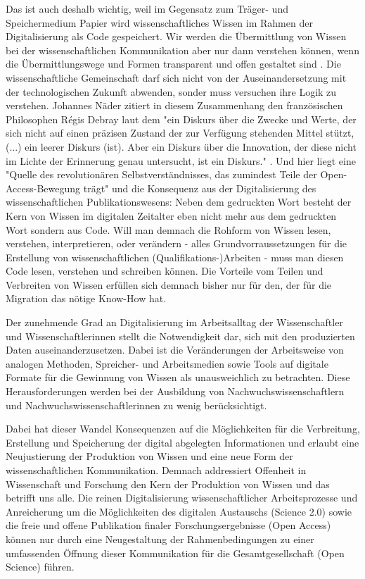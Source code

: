Das ist auch deshalb wichtig, weil im Gegensatz zum Träger- und Speichermedium Papier wird wissenschaftliches Wissen im Rahmen der Digitalisierung als Code gespeichert. Wir werden die Übermittlung von Wissen bei der wissenschaftlichen Kommunikation aber nur dann verstehen können, wenn die Übermittlungswege und Formen transparent und offen gestaltet sind \cite{davis_2011_open}. Die wissenschaftliche Gemeinschaft darf sich nicht von der Auseinandersetzung mit der technologischen Zukunft abwenden, sonder muss versuchen ihre Logik zu verstehen. Johannes Näder zitiert in diesem Zusammenhang den französischen Philosophen Régis Debray laut dem "ein Diskurs über die Zwecke und Werte, der sich nicht auf einen präzisen Zustand der zur Verfügung stehenden Mittel stützt, (...) ein leerer Diskurs (ist). Aber ein Diskurs über die Innovation, der diese nicht im Lichte der Erinnerung genau untersucht, ist ein Diskurs." \cite[:117]{naeder_2010_open} \cite[:246]{debray2003einfuhrung}. Und hier liegt eine "Quelle des revolutionären Selbstverständnisses, das zumindest Teile der Open-Access-Bewegung trägt" und die Konsequenz aus der Digitalisierung des wissenschaftlichen Publikationswesens: Neben dem gedruckten Wort besteht der Kern von Wissen im digitalen Zeitalter eben nicht mehr aus dem gedruckten Wort sondern aus Code. Will man demnach die Rohform von Wissen lesen, verstehen, interpretieren, oder verändern - alles Grundvorraussetzungen für die Erstellung von wissenschaftlichen (Qualifikations-)Arbeiten - muss man diesen Code lesen, verstehen und schreiben können. Die Vorteile vom Teilen und Verbreiten von Wissen erfüllen sich demnach bisher nur für den, der für die Migration das nötige Know-How hat.

Der zunehmende Grad an Digitalisierung im Arbeitsalltag der Wissenschaftler und Wissenschaftlerinnen stellt die Notwendigkeit dar, sich mit den produzierten Daten auseinanderzusetzen. Dabei ist die Veränderungen der Arbeitsweise von analogen Methoden, Spreicher- und Arbeitsmedien sowie Tools auf digitale Formate für die Gewinnung von Wissen als unausweichlich zu betrachten. Diese Herausforderungen werden bei der Ausbildung von Nachwuchswissenschaftlern und Nachwuchswissenschaftlerinnen zu wenig berücksichtigt.

Dabei hat dieser Wandel Konsequenzen auf die Möglichkeiten für die Verbreitung, Erstellung und Speicherung der digital abgelegten Informationen und erlaubt eine Neujustierung der Produktion von Wissen und eine neue Form der wissenschaftlichen Kommunikation. Demnach addressiert Offenheit in Wissenschaft und Forschung den Kern der Produktion von Wissen und das betrifft uns alle. \cite{Mussell_2013} Die reinen Digitalisierung wissenschaftlicher Arbeitsprozesse und Anreicherung um die Möglichkeiten des digitalen Austauschs (Science 2.0) sowie die freie und offene Publikation finaler Forschungsergebnisse (Open Access) können nur durch eine Neugestaltung der Rahmenbedingungen zu einer umfassenden Öffnung dieser Kommunikation für die Gesamtgesellschaft (Open Science) führen.

